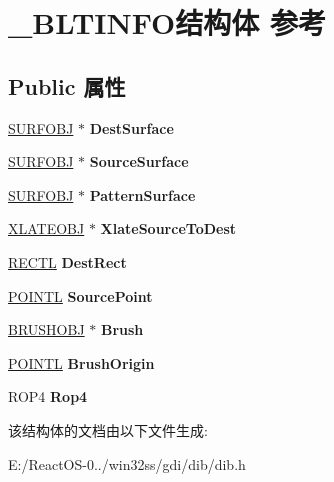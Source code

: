 \hypertarget{struct___b_l_t_i_n_f_o}{}\section{\+\_\+\+B\+L\+T\+I\+N\+F\+O结构体 参考}
\label{struct___b_l_t_i_n_f_o}
\subsection*{Public 属性}
\begin{DoxyCompactItemize}
\item 
\mbox{\label{struct___b_l_t_i_n_f_o_a6216e5f0b1ccb7ea7f708dfe54aac13a}} 
\hyperlink{struct___s_u_r_f_o_b_j}{S\+U\+R\+F\+O\+BJ} $\ast$ {\bfseries Dest\+Surface}
\item 
\mbox{\label{struct___b_l_t_i_n_f_o_a4bc1bc36a9b502d8f5ce14b52186d4d3}} 
\hyperlink{struct___s_u_r_f_o_b_j}{S\+U\+R\+F\+O\+BJ} $\ast$ {\bfseries Source\+Surface}
\item 
\mbox{\label{struct___b_l_t_i_n_f_o_a81c4c42c30d589e364d94dc35a743481}} 
\hyperlink{struct___s_u_r_f_o_b_j}{S\+U\+R\+F\+O\+BJ} $\ast$ {\bfseries Pattern\+Surface}
\item 
\mbox{\label{struct___b_l_t_i_n_f_o_af6adea0bf613a249cd804d408d69b695}} 
\hyperlink{struct___x_l_a_t_e_o_b_j}{X\+L\+A\+T\+E\+O\+BJ} $\ast$ {\bfseries Xlate\+Source\+To\+Dest}
\item 
\mbox{\label{struct___b_l_t_i_n_f_o_a2b46dba508e4e44cb8f3deb31e1b0e4f}} 
\hyperlink{struct___r_e_c_t_l}{R\+E\+C\+TL} {\bfseries Dest\+Rect}
\item 
\mbox{\label{struct___b_l_t_i_n_f_o_aec4b72730262d36b221f07bd7142d877}} 
\hyperlink{struct___p_o_i_n_t_l}{P\+O\+I\+N\+TL} {\bfseries Source\+Point}
\item 
\mbox{\label{struct___b_l_t_i_n_f_o_a8789c874fb2badb42ca155884afcfefb}} 
\hyperlink{struct___b_r_u_s_h_o_b_j}{B\+R\+U\+S\+H\+O\+BJ} $\ast$ {\bfseries Brush}
\item 
\mbox{\label{struct___b_l_t_i_n_f_o_a2ee9c573618e3e6c6d73a363d6c391c8}} 
\hyperlink{struct___p_o_i_n_t_l}{P\+O\+I\+N\+TL} {\bfseries Brush\+Origin}
\item 
\mbox{\label{struct___b_l_t_i_n_f_o_a795c2576f69d66de142ad39b7ed5a3ed}} 
R\+O\+P4 {\bfseries Rop4}
\end{DoxyCompactItemize}


该结构体的文档由以下文件生成\+:\begin{DoxyCompactItemize}
\item 
E\+:/\+React\+O\+S-\/0../win32ss/gdi/dib/dib.\+h\end{DoxyCompactItemize}
